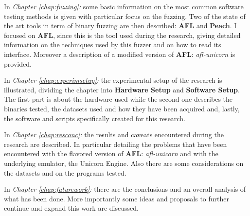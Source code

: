 \documentclass[../main.tex]{subfiles}
\begin{document}
\bigskip \noindent
In \textit{Chapter \ref{chap:fuzzing}: } some basic information on the most common software testing methods is given with particular focus on the fuzzing. Two of the state of the art tools in term of binary fuzzing are then described: \textbf{AFL} and \textbf{Peach}. I focused on \textbf{AFL}, since this is the tool used during the research, giving detailed information on the techniques used by this fuzzer and on how to read its interface. Moreover a description of a modified version of \textbf{AFL}: \textit{afl-unicorn} is provided.

\bigskip \noindent
In \textit{Chapter \ref{chap:experimsetup}: } the experimental setup of the research is illustrated, dividing the chapter into \textbf{Hardware Setup} and \textbf{Software Setup}. The first part is about the hardware used while the second one describes the binaries tested, the datasets used and how they have been acquired and, lastly, the software and scripts specifically created for this research.

\bigskip \noindent
In \textit{Chapter \ref{chap:resconc}: } the results and caveats encountered during the research are described. In particular detailing the problems that have been encountered with the flavored version of \textbf{AFL}: \textit{afl-unicorn} and with the underlying emulator, the Unicorn Engine. Also there are some considerations on the datasets and on the programs tested.

\bigskip \noindent
In \textit{Chapter \ref{chap:futurework}: } there are the conclusions and an overall analysis of what has been done. More importantly some ideas and proposals to further continue and expand this work are discussed.
\newline
\end{document}
